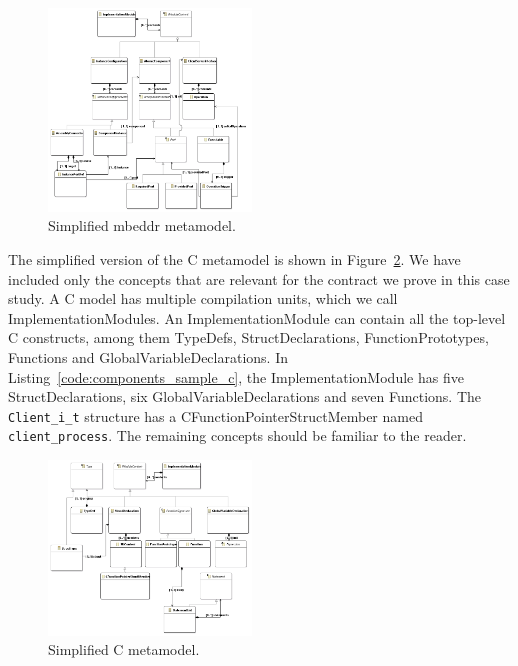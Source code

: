 \begin{figure}
\begin{center}
  \includegraphics[width=0.48\textwidth]{figures/mbeddr/Moduleclassdiagram}
  \caption{Simplified mbeddr metamodel. }
  \label{fig:Moduleclassdiagram}
\end{center}
\end{figure}

The simplified version of the C metamodel is shown in
Figure~\ref{fig:CModelclassdiagram}.
We have included only the concepts that are relevant for the contract we prove
in this case study.
A C model has multiple compilation units, which we call
ImplementationModules.
An ImplementationModule can contain all the top-level C constructs, among them
TypeDefs, StructDeclarations, FunctionPrototypes, Functions and
GlobalVariableDeclarations.
In Listing~\ref{code:components_sample_c}, the ImplementationModule has five
StructDeclarations, six GlobalVariableDeclarations and seven Functions.
The \verb=Client_i_t= structure has a CFunctionPointerStructMember named
\verb=client_process=. The remaining concepts should be familiar to the
reader.

\begin{figure}
\begin{center}
  \includegraphics[width=0.48\textwidth]{figures/mbeddr/CModelclassdiagram}
  \caption{Simplified C metamodel. }
  \label{fig:CModelclassdiagram}
\end{center}
\end{figure}


